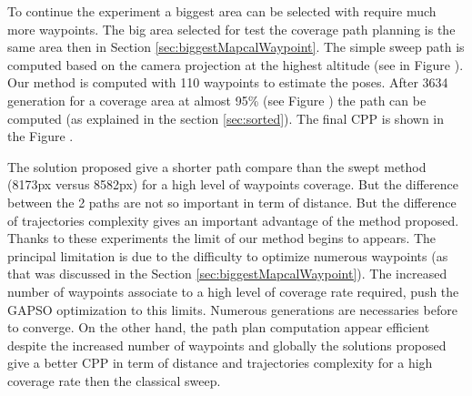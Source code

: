 To continue the experiment a biggest area can be selected with require much more waypoints. The big area selected for test the coverage path planning is the same area then in Section \ref{sec:biggestMapcalWaypoint}. 
The simple sweep path is computed based on the camera projection at the highest altitude (see in Figure ). Our method is computed  with 110 waypoints to estimate the poses. After 3634 generation for a coverage area at almost 95\% (see Figure ) the path  can be computed (as explained in the section \ref{sec:sorted}).  The final CPP is shown in the Figure . 

The solution proposed give a shorter path compare than the swept method (8173px versus 8582px) for a high level of waypoints coverage. But the difference between the 2 paths are not so important  %
in term of distance. But the difference of trajectories complexity gives an important advantage of the method proposed.\\
Thanks to these experiments the limit of our method begins to appears. The principal limitation is due to the difficulty to optimize numerous waypoints (as that was discussed in the Section \ref{sec:biggestMapcalWaypoint}). The increased number of waypoints associate to a high level of coverage rate required, push the GAPSO optimization to this limits. Numerous generations are necessaries before to converge. On the other hand, the path plan computation appear efficient despite the increased number of waypoints and globally the solutions proposed give a better CPP in term of distance and trajectories complexity for a high coverage rate then the classical sweep.


 
 

